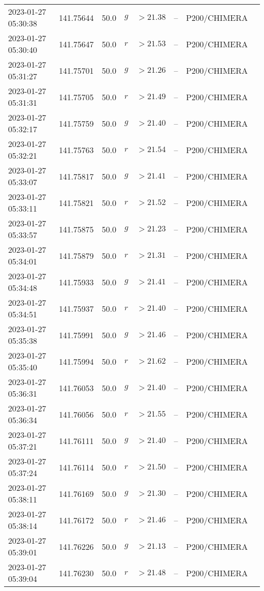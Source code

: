 \documentclass{nature_plusfigure}
\begin{document}
\begin{supplement}
\begin{center}
\begin{longtable}{llllllll}
2023-01-27 05:30:38 & 141.75644 & 50.0 & $g$ & $>21.38$ & -- & P200/CHIMERA &  \\ 
2023-01-27 05:30:40 & 141.75647 & 50.0 & $r$ & $>21.53$ & -- & P200/CHIMERA &  \\ 
2023-01-27 05:31:27 & 141.75701 & 50.0 & $g$ & $>21.26$ & -- & P200/CHIMERA &  \\ 
2023-01-27 05:31:31 & 141.75705 & 50.0 & $r$ & $>21.49$ & -- & P200/CHIMERA &  \\ 
2023-01-27 05:32:17 & 141.75759 & 50.0 & $g$ & $>21.40$ & -- & P200/CHIMERA &  \\ 
2023-01-27 05:32:21 & 141.75763 & 50.0 & $r$ & $>21.54$ & -- & P200/CHIMERA &  \\ 
2023-01-27 05:33:07 & 141.75817 & 50.0 & $g$ & $>21.41$ & -- & P200/CHIMERA &  \\ 
2023-01-27 05:33:11 & 141.75821 & 50.0 & $r$ & $>21.52$ & -- & P200/CHIMERA &  \\ 
2023-01-27 05:33:57 & 141.75875 & 50.0 & $g$ & $>21.23$ & -- & P200/CHIMERA &  \\ 
2023-01-27 05:34:01 & 141.75879 & 50.0 & $r$ & $>21.31$ & -- & P200/CHIMERA &  \\ 
2023-01-27 05:34:48 & 141.75933 & 50.0 & $g$ & $>21.41$ & -- & P200/CHIMERA &  \\ 
2023-01-27 05:34:51 & 141.75937 & 50.0 & $r$ & $>21.40$ & -- & P200/CHIMERA &  \\ 
2023-01-27 05:35:38 & 141.75991 & 50.0 & $g$ & $>21.46$ & -- & P200/CHIMERA &  \\ 
2023-01-27 05:35:40 & 141.75994 & 50.0 & $r$ & $>21.62$ & -- & P200/CHIMERA &  \\ 
2023-01-27 05:36:31 & 141.76053 & 50.0 & $g$ & $>21.40$ & -- & P200/CHIMERA &  \\ 
2023-01-27 05:36:34 & 141.76056 & 50.0 & $r$ & $>21.55$ & -- & P200/CHIMERA &  \\ 
2023-01-27 05:37:21 & 141.76111 & 50.0 & $g$ & $>21.40$ & -- & P200/CHIMERA &  \\ 
2023-01-27 05:37:24 & 141.76114 & 50.0 & $r$ & $>21.50$ & -- & P200/CHIMERA &  \\ 
2023-01-27 05:38:11 & 141.76169 & 50.0 & $g$ & $>21.30$ & -- & P200/CHIMERA &  \\ 
2023-01-27 05:38:14 & 141.76172 & 50.0 & $r$ & $>21.46$ & -- & P200/CHIMERA &  \\ 
2023-01-27 05:39:01 & 141.76226 & 50.0 & $g$ & $>21.13$ & -- & P200/CHIMERA &  \\ 
2023-01-27 05:39:04 & 141.76230 & 50.0 & $r$ & $>21.48$ & -- & P200/CHIMERA &  \\ 

\end{longtable}
\end{center}
\end{supplement}
\end{document}
